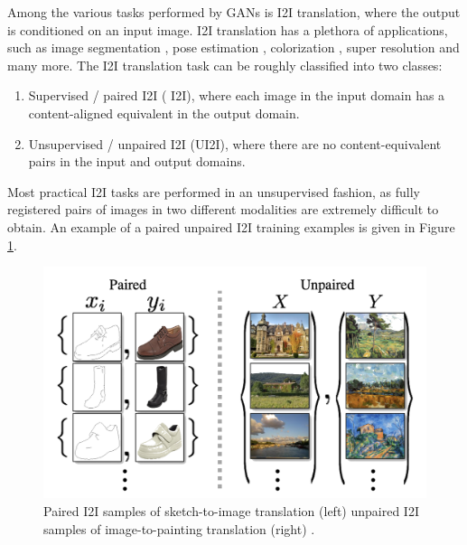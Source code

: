 Among the various tasks performed by GANs is I2I translation, where the output is conditioned on an input image.
I2I translation has a plethora of applications, such as image segmentation \cite{yang2018mri, li2020simplified}, pose estimation \cite{li2020manigan, fish2017adversarial}, colorization \cite{isola2017image, suarez2017infrared, zhang2017real}, super resolution \cite{yuan2018unsupervised, zhang2019multiple} and many more.
The I2I translation task can be roughly classified into two classes:
\begin{enumerate}
    \item Supervised / paired I2I ( I2I), where each image in the input domain has a content-aligned equivalent in the output domain. 
    \item Unsupervised / unpaired I2I (UI2I), where there are no content-equivalent pairs in the input and output domains.
\end{enumerate}
Most practical I2I tasks are performed in an unsupervised fashion, as fully registered pairs of images in two different modalities are extremely difficult to obtain.
An example of a paired \vs unpaired I2I training examples is given in Figure \ref{fig:paired_vs_unpaired}.
\begin{figure}[H]
    \centering
    \includegraphics[width=0.75\linewidth]{../figs/related_work/paird_vs_unpaired_I2I.png}
    \caption{Paired I2I samples of sketch-to-image translation (left) \vs unpaired I2I samples of image-to-painting translation (right) \cite{CycleGAN2017}.}
    \label{fig:paired_vs_unpaired}
\end{figure}
    
